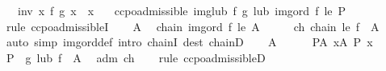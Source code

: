 \begin{isabellebody}
\ \ \ inv{\isacharcolon}{\kern0pt}\ {\isachardoublequoteopen}{\isasymAnd}x{\isachardot}{\kern0pt}\ f\ {\isacharparenleft}{\kern0pt}g\ x{\isacharparenright}{\kern0pt}\ {\isacharequal}{\kern0pt}\ x{\isachardoublequoteclose}\isanewline
\ \ \ {\isachardoublequoteopen}ccpo{\isachardot}{\kern0pt}admissible\ {\isacharparenleft}{\kern0pt}img{\isacharunderscore}{\kern0pt}lub\ f\ g\ lub{\isacharparenright}{\kern0pt}\ {\isacharparenleft}{\kern0pt}img{\isacharunderscore}{\kern0pt}ord\ f\ le{\isacharparenright}{\kern0pt}\ P{\isachardoublequoteclose}\isanewline
%
\isadelimproof
%
\endisadelimproof
%
\isatagproof
{}\isamarkupfalse%
\ {\isacharparenleft}{\kern0pt}rule\ ccpo{\isachardot}{\kern0pt}admissibleI{\isacharparenright}{\kern0pt}\isanewline
\ \ \isamarkupfalse%
\ A\ \isamarkupfalse%
\ {\isachardoublequoteopen}chain\ {\isacharparenleft}{\kern0pt}img{\isacharunderscore}{\kern0pt}ord\ f\ le{\isacharparenright}{\kern0pt}\ A{\isachardoublequoteclose}\isanewline
\ \ \isamarkupfalse%
\ \isamarkupfalse%
\ ch{\isacharprime}{\kern0pt}{\isacharcolon}{\kern0pt}\ {\isachardoublequoteopen}chain\ le\ {\isacharparenleft}{\kern0pt}f\ {\isacharbackquote}{\kern0pt}\ A{\isacharparenright}{\kern0pt}{\isachardoublequoteclose}\isanewline
\ \ \ \ \isamarkupfalse%
\ {\isacharparenleft}{\kern0pt}auto\ simp{\isacharcolon}{\kern0pt}\ img{\isacharunderscore}{\kern0pt}ord{\isacharunderscore}{\kern0pt}def\ intro{\isacharcolon}{\kern0pt}\ chainI\ dest{\isacharcolon}{\kern0pt}\ chainD{\isacharparenright}{\kern0pt}\isanewline
\ \ \isamarkupfalse%
\ {\isachardoublequoteopen}A\ {\isasymnoteq}\ {\isacharbraceleft}{\kern0pt}{\isacharbraceright}{\kern0pt}{\isachardoublequoteclose}\isanewline
\ \ \isamarkupfalse%
\ P{\isacharunderscore}{\kern0pt}A{\isacharcolon}{\kern0pt}\ {\isachardoublequoteopen}{\isasymforall}x{\isasymin}A{\isachardot}{\kern0pt}\ P\ x{\isachardoublequoteclose}\isanewline
\ \ \isamarkupfalse%
\ {\isachardoublequoteopen}{\isacharparenleft}{\kern0pt}P\ {\isasymcirc}\ g{\isacharparenright}{\kern0pt}\ {\isacharparenleft}{\kern0pt}lub\ {\isacharparenleft}{\kern0pt}f\ {\isacharbackquote}{\kern0pt}\ A{\isacharparenright}{\kern0pt}{\isacharparenright}{\kern0pt}{\isachardoublequoteclose}\ \isamarkupfalse%
\ adm\ ch{\isacharprime}{\kern0pt}\isanewline
\ \ \isamarkupfalse%
\ {\isacharparenleft}{\kern0pt}rule\ ccpo{\isachardot}{\kern0pt}admissibleD{\isacharparenright}{\kern0pt}\isanewline

\end{isabellebody}
